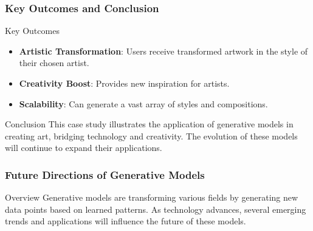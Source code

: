 \documentclass[aspectratio=169]{beamer}
\begin{document}
\begin{frame}[fragile]
  \frametitle{Key Outcomes and Conclusion}
  \begin{block}{Key Outcomes}
    \begin{itemize}
      \item \textbf{Artistic Transformation}: Users receive transformed artwork in the style of their chosen artist.
      \item \textbf{Creativity Boost}: Provides new inspiration for artists.
      \item \textbf{Scalability}: Can generate a vast array of styles and compositions.
    \end{itemize}
  \end{block}

  \begin{block}{Conclusion}
    This case study illustrates the application of generative models in creating art, bridging technology and creativity. The evolution of these models will continue to expand their applications.
  \end{block}
\end{frame}

\begin{frame}[fragile]
    \frametitle{Future Directions of Generative Models}
    \begin{block}{Overview}
        Generative models are transforming various fields by generating new data points based on learned patterns. As technology advances, several emerging trends and applications will influence the future of these models.
    \end{block}
\end{frame}
\end{document}
